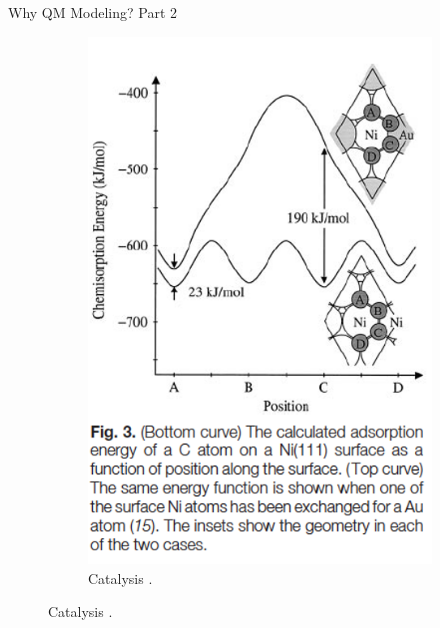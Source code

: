 \documentclass[aspectratio=169]{beamer}
\begin{document}
\begin{frame}{Why QM Modeling? Part 2}
\begin{figure}
\begin{subfigure}{0.2\linewidth}
                \includegraphics[width=\linewidth]{lectures/figures/0.4_catalysis.png}
                \caption{Catalysis \cite{besenbacherDesignSurfaceAlloy1998}.}
            \end{subfigure}
        \end{figure}
    \end{frame}
\end{document}
